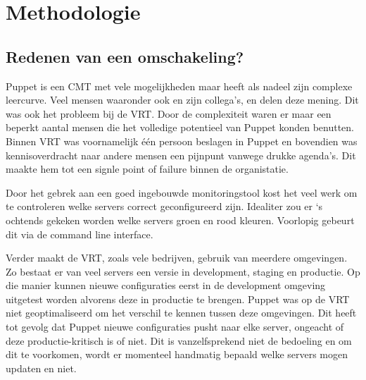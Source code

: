 
\chapter{Methodologie}
\label{ch:methodologie}


\section{Redenen van een omschakeling?}
\label{sec:methodologie-redenen-omschakeling}

Puppet is een CMT met vele mogelijkheden maar heeft als nadeel zijn complexe leercurve. Veel mensen waaronder ook \textcite{danAnsiblevsPuppet} en zijn collega's, \textcite{martinAnsiblevsPuppet} en \textcite{AliAnsiblevsPuppet} delen deze mening. Dit was ook het probleem bij de \gls{VRT}. Door de complexiteit waren er maar een beperkt aantal mensen die het volledige potentieel van Puppet konden benutten. Binnen \gls{VRT} was voornamelijk \'e\'en persoon beslagen in Puppet en bovendien was kennisoverdracht naar andere mensen een pijnpunt vanwege drukke agenda's. Dit maakte hem tot een signle point of failure binnen de organistatie.

Door het gebrek aan een goed ingebouwde monitoringstool kost het veel werk om te controleren welke servers correct geconfigureerd zijn. Idealiter zou er  `s ochtends gekeken worden welke servers groen en rood kleuren. Voorlopig gebeurt dit via de command line interface.  

Verder maakt de \gls{VRT}, zoals vele bedrijven, gebruik van meerdere omgevingen. Zo bestaat er van veel servers een versie in development, staging en productie. Op die manier kunnen nieuwe configuraties eerst in de development omgeving uitgetest worden alvorens deze in productie te brengen. Puppet was op de \gls{VRT} niet geoptimaliseerd om het verschil te kennen tussen deze omgevingen. Dit heeft tot gevolg dat Puppet nieuwe configuraties pusht naar elke server, ongeacht of deze productie-kritisch is of niet. Dit is vanzelfsprekend niet de bedoeling en om dit te voorkomen, wordt er momenteel handmatig bepaald welke servers mogen updaten en niet. 
 
